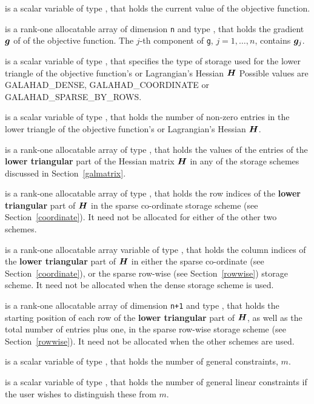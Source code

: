 \documentclass{galahad}
\newcommand{\sym}{\sf\small}
\begin{document}
\begin{description}
 is a scalar variable of type \realdp,
that holds the current value of the objective function.

 is a rank-one allocatable array of dimension {\tt n} and type 
\realdp, that holds the gradient ${\bm{g}}$ 
of of the objective function.
The $j$-th component of 
{\tt g}, $j = 1,  \ldots ,  n$, contains ${\bm{g}}_{j}$.

 is a scalar variable of type \integer, 
that specifies the type of storage used for the lower triangle of the 
objective function's or Lagrangian's Hessian ${\bm{H}}$
Possible values are {\sym GALAHAD\_DENSE}, {\sym GALAHAD\_COORDINATE} 
or {\sym GALAHAD\_SPARSE\_BY\_ROWS}.

 is a scalar variable of type \integer, 
that holds the number of non-zero entries in the lower triangle of the
objective function's or Lagrangian's Hessian ${\bm{H}}$.

 is a rank-one allocatable array of type \realdp, that holds
the values of the entries of the {\bf lower triangular} part
of the Hessian matrix ${\bm{H}}$ in any of the 
storage schemes discussed in Section~\ref{galmatrix}.

 is a rank-one allocatable array of type \integer,
that holds the row indices of the {\bf lower triangular} part of ${\bm{H}}$ 
in the sparse co-ordinate storage
scheme (see Section~\ref{coordinate}). 
It need not be allocated for either of the other two schemes.

 is a rank-one allocatable array variable of type \integer,
that holds the column indices of the {\bf lower triangular} part of 
${\bm{H}}$ in either the sparse co-ordinate 
(see Section~\ref{coordinate}), or the sparse row-wise 
(see Section~\ref{rowwise}) storage scheme.
It need not be allocated when the dense storage scheme is used.

 is a rank-one allocatable array of dimension {\tt n+1} and type 
\integer, that holds the starting position of 
each row of the {\bf lower triangular} part of ${\bm{H}}$, as well
as the total number of entries plus one, in the sparse row-wise storage
scheme (see Section~\ref{rowwise}). It need not be allocated when the
other schemes are used.

 is a scalar variable of type \integer, 
 that holds the number of general constraints, $m$.

 is a scalar variable of type \integer, 
 that holds the number of general linear constraints if the user wishes
to distinguish these from $m$.


\end{description}
\end{document}
